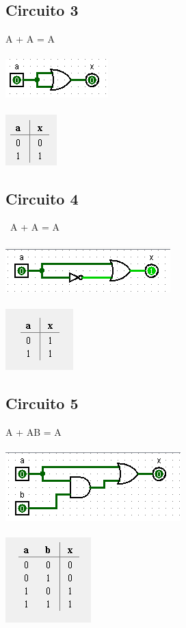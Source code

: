\documentclass[12pt]{article}
\begin{document}
\subsection{Circuito 3}
A + A = A\\
\\\includegraphics{./images/circuito03.png}\\
\\\includegraphics{./images/circuito03_table.png}

\subsection{Circuito 4}
~A + A = A\\
\\\includegraphics{./images/circuito04.png}\\
\\\includegraphics{./images/circuito04_table.png}

\subsection{Circuito 5}
A + AB = A\\
\\\includegraphics{./images/circuito05.png}\\
\\\includegraphics{./images/circuito05_table.png}
\end{document}
